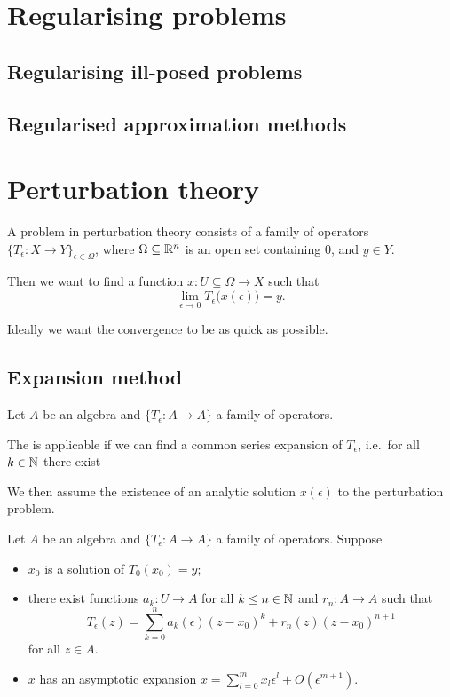 \section{Regularising problems}
\subsection{Regularising ill-posed problems}
\subsection{Regularised approximation methods}

\section{Perturbation theory}

\begin{definition}
A problem in perturbation theory consists of a family of operators $\{T_\epsilon: X\to Y\}_{\epsilon\in \Omega}$, where $\Omega\subseteq \mathbb{R}^n$ is an open set containing $0$, and $y\in Y$.

Then we want to find a function $x: U\subseteq \Omega \to X$ such that
\[ \lim_{\epsilon \to 0} T_\epsilon\big(x(\epsilon)\big) = y. \]
\end{definition}
Ideally we want the convergence to be as quick as possible.

\subsection{Expansion method}
\begin{definition}
Let $A$ be an algebra and $\{T_\epsilon: A\to A\}$ a family of operators.


The  is applicable if we can find a common series expansion of $T_\epsilon$, i.e.\ for all $k\in \mathbb{N}$ there exist

We then assume the existence of an analytic solution $x(\epsilon)$ to the perturbation problem.
\end{definition}

Let $A$ be an algebra and $\{T_\epsilon: A\to A\}$ a family of operators.
Suppose
\begin{itemize}
\item $x_0$ is a solution of $T_0(x_0) = y$;
\item there exist functions $a_k: U \to A$ for all $k\leq n\in \mathbb{N}$ and $r_n: A\to A$ such that
\[ T_\epsilon(z) = \sum_{k=0}^n a_k(\epsilon)(z-x_0)^k + r_n(z)(z-x_0)^{n+1} \]
for all $z\in A$.
\item $x$ has an asymptotic expansion $x = \sum_{l=0}^m x_l\epsilon^l + O(\epsilon^{m+1})$.
\end{itemize}


